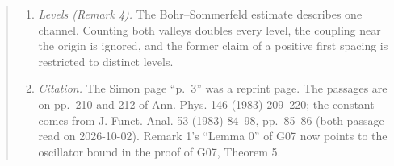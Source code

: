 \documentclass[11pt,a4paper]{article}
\begin{document}
\begin{quote}
\begin{enumerate}
  computes the floor-admitted volume of both valleys up to a bounded
  remainder, \((8\sqrt2\pi m/g)E^{3/2}[\ln(E/\varepsilon)+O(1)]\), and
  compares its quotient by \(h^2\) with Simon's exact leading
  asymptotics, which it matches, constant included.
\item
  \emph{Levels (Remark 4).} The Bohr--Sommerfeld estimate describes one
  channel. Counting both valleys doubles every level, the coupling near
  the origin is ignored, and the former claim of a positive first
  spacing is restricted to distinct levels.
\item
  \emph{Citation.} The Simon page ``p.~3'' was a reprint page. The
  passages are on pp.~210 and 212 of Ann. Phys. 146 (1983) 209--220; the
  constant comes from J. Funct. Anal. 53 (1983) 84--98, pp.~85--86 (both
  passage read on 2026-10-02). Remark 1's ``Lemma 0'' of G07 now points
  to the oscillator bound in the proof of G07, Theorem 5.
\end{enumerate}
\end{quote}
\end{document}
